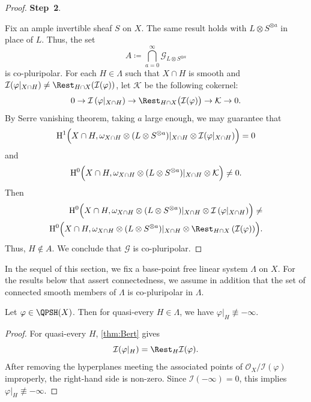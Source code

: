 \begin{proof}
\textbf{Step~2}.

Fix an ample invertible sheaf $S$ on $X$. The same result holds with $L\otimes S^{\otimes a}$ in place of $L$. Thus, the set
\[
A\coloneqq \bigcap_{a=0}^{\infty}\mathcal{G}_{L\otimes S^{\otimes a}}
\]
is co-pluripolar.
For each $H\in \Lambda$ such that $X\cap H$ is smooth and $\mathcal{I}(\varphi|_{X\cap H})\neq \Rest_{H\cap X}(\mathcal{I}(\varphi))$, let $\mathcal{K}$ be the following cokernel:
\[
0\rightarrow \mathcal{I}\left(\varphi|_{X\cap H}\right)\rightarrow \Rest_{H\cap X}\bigl(\mathcal{I}(\varphi)\bigr)\rightarrow \mathcal{K}\rightarrow 0.
\]
By Serre vanishing theorem, taking $a$ large enough, we may guarantee that
\[
\mathrm{H}^1\Bigl(X\cap H,\omega_{X\cap H}\otimes (L\otimes S^{\otimes a})|_{X\cap H}\otimes \mathcal{I}(\varphi|_{X\cap H})\Bigr)=0
\]
and
\[
\mathrm{H}^0\Bigl(X\cap H,\omega_{X\cap H}\otimes (L\otimes S^{\otimes a})|_{X\cap H}\otimes \mathcal{K}\Bigr)\neq 0.
\]
Then
\[
\begin{split}
\mathrm{H}^0\Bigl(X\cap H,\omega_{X\cap H}\otimes(L\otimes S^{\otimes a})|_{X\cap H}\otimes\mathcal{I}\left(\varphi|_{X\cap H}\right)\Bigr)\neq \\
\mathrm{H}^0\Bigl(X\cap H,\omega_{X\cap H}\otimes(L\otimes S^{\otimes a})|_{X\cap H}\otimes \Rest_{H\cap X}\left(\mathcal{I}(\varphi)\right)\Bigr).
\end{split}
\]
Thus, $H\not\in A$. We conclude that $\mathcal{G}$ is co-pluripolar.
\end{proof}


In the sequel of this section, we fix a base-point free linear system $\Lambda$ on $X$. For the results below that assert connectedness, we assume in addition that the set of connected smooth members of $\Lambda$ is co-pluripolar in $\Lambda$.
\begin{corollary}\label{cor:qpshgeneralres}
    Let $\varphi\in \QPSH(X)$. Then for quasi-every $H\in \Lambda$, we have $\varphi|_H\not\equiv -\infty$.
\end{corollary}
\begin{proof}
    For quasi-every $H$, \cref{thm:Bert} gives
    \[
        \mathcal I(\varphi|_H)=\Rest_H\mathcal I(\varphi).
    \]
    After removing the hyperplanes meeting the associated points of $\mathcal O_X/\mathcal I(\varphi)$ improperly, the right-hand side is non-zero. Since $\mathcal I(-\infty)=0$, this implies $\varphi|_H\not\equiv-\infty$.
\end{proof}

